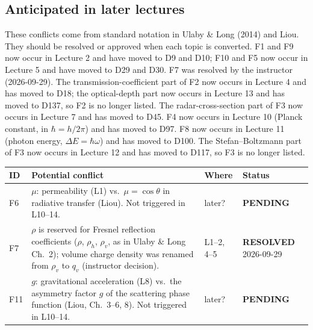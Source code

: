 \documentclass[11pt, oneside]{article}
\newcommand{\pending}{\textbf{PENDING}}
\newcommand{\resolved}{\textbf{RESOLVED}}
\begin{document}
\subsection*{Anticipated in later lectures}
These conflicts come from standard notation in Ulaby \& Long (2014) and Liou. They should be resolved or approved when each topic is converted. F1 and F9 now occur in Lecture 2 and have moved to D9 and D10; F10 and F5 now occur in Lecture 5 and have moved to D29 and D30. F7 was resolved by the instructor (2026-09-29). The transmission-coefficient part of F2 now occurs in Lecture 4 and has moved to D18; the optical-depth part now occurs in Lecture 13 and has moved to D137, so F2 is no longer listed. The radar-cross-section part of F3 now occurs in Lecture 7 and has moved to D45. F4 now occurs in Lecture 10 (Planck constant, in $\hbar = h/2\pi$) and has moved to D97. F8 now occurs in Lecture 11 (photon energy, $\Delta E = \hbar\omega$) and has moved to D100. The Stefan--Boltzmann part of F3 now occurs in Lecture 12 and has moved to D117, so F3 is no longer listed.
\begin{longtable}{l >{\raggedright\arraybackslash}p{} l l}
\hline
ID & Potential conflict & Where & Status \\
\hline
\endhead
F6 & $\mu$: permeability (L1) vs.\ $\mu = \cos\theta$ in radiative transfer (Liou). Not triggered in L10--14. & later? & \pending \\
F7 & $\rho$ is reserved for Fresnel reflection coefficients ($\rho$, $\rho_h$, $\rho_v$, as in Ulaby \& Long Ch.~2); volume charge density was renamed from $\rho_v$ to $q_v$ (instructor decision). & L1--2, 4--5 & \resolved{} 2026-09-29 \\
F11 & $g$: gravitational acceleration (L8) vs.\ the asymmetry factor $g$ of the scattering phase function (Liou, Ch.~3--6, 8). Not triggered in L10--14. & later? & \pending \\
\hline
\end{longtable}
\end{document}
